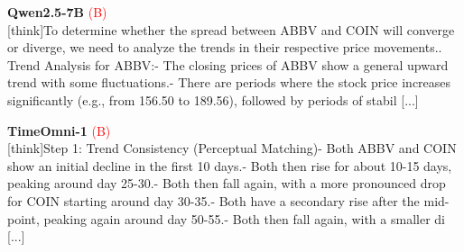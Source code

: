 \noindent
\begin{minipage}[t]{0.28\textwidth}
\colorbox{red!8}{\parbox{\dimexpr\textwidth-2\fboxsep}{
\textbf{Qwen2.5-7B} \textcolor{red}{(B)} \\[2pt]
\tiny
[think]\newline To determine whether the spread between ABBV and COIN will converge or diverge, we need to analyze the trends in their respective price movements.. Trend Analysis for ABBV:\newline    - The closing prices of ABBV show a general upward trend with some fluctuations.\newline    - There are periods where the stock price increases significantly (e.g., from 156.50 to 189.56), followed by periods of stabil [...]
}}
\end{minipage}
\hfill
\begin{minipage}[t]{0.28\textwidth}
\colorbox{red!8}{\parbox{\dimexpr\textwidth-2\fboxsep}{
\textbf{TimeOmni-1} \textcolor{red}{(B)} \\[2pt]
\tiny
[think]\newline Step 1: Trend Consistency (Perceptual Matching)\newline - Both ABBV and COIN show an initial decline in the first  10 days.\newline - Both then rise for about 10-15 days, peaking around day 25-30.\newline - Both then fall again, with a more pronounced drop for COIN starting around day 30-35.\newline - Both have a secondary rise after the mid-point, peaking again around day 50-55.\newline - Both then fall again, with a smaller di [...]
}}
\end{minipage}
\hfill
